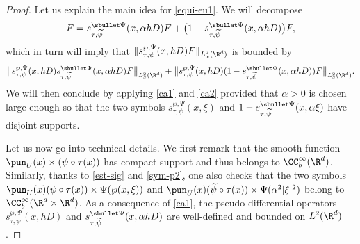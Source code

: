 \begin{proof}
Let us explain the main idea for \eqref{equi-eu1}. We will decompose
\begin{equation*}
F=s_{\tau,\widetilde{\psi}}^{\sbullet\Psi}(x,\alpha hD)F+\bigl(1-s_{\tau,\widetilde{\psi}}^{\sbullet\Psi}(x,\alpha h D)\bigr)F,
\end{equation*}
which in turn will imply that $\|s_{\tau,\psi}^{\wp,\Psi}(x,hD)F \|_{L_x^2(\R^d)}$ is bounded by
\begin{equation*}
\bigl\|s_{\tau,\psi}^{\wp,\Psi}(x,hD)s_{\tau,\widetilde{\psi}}^{\sbullet\Psi}(x,\alpha hD)F \bigr\|_{L_x^2(\R^d)}+\bigl\|s_{\tau,\psi}^{\wp,\Psi}(x,hD)(1-s_{\tau,\widetilde{\psi}}^{\sbullet\Psi}(x,\alpha hD))F \bigr\|_{L_x^2(\R^d)}.
\end{equation*}
We will then conclude by applying \eqref{ca1} and \eqref{ca2}
provided that $\alpha>0$ is chosen large enough so that the two symbols
$s_{\tau,\psi}^{\wp,\Psi}(x,\xi)$ and $1-s_{\tau,\widetilde{\psi}}^{\sbullet\Psi}(x,\alpha\xi)$ have disjoint supports.

Let us now go into technical details.
We first remark that the smooth function $\pun_{U}(x)\times (\psi\circ \tau(x))$ has compact support and thus belongs to $\CC_b^\infty(\R^d)$.
Similarly, thanks to \eqref{est-sig} and \eqref{sym-p2}, one also checks
that the two symbols $\pun_{U}(x)(\psi\circ \tau(x))\times \Psi(\wp(x,\xi))$ and $\pun_{U}(x)(\widetilde{\psi}\circ \tau(x))\times \Psi(\alpha^2 |\xi|^2)$
belong to $\CC_b^\infty(\R^d\times \R^d)$.
As a consequence of \eqref{ca1}, the pseudo-differential operators $s_{\tau,\psi}^{\wp,\Psi}(x,hD)$ and $s_{\tau,\widetilde{\psi}}^{\sbullet \Psi}(x,\alpha hD)$ are well-defined and bounded on $L^2(\R^d)$.


\end{proof}
